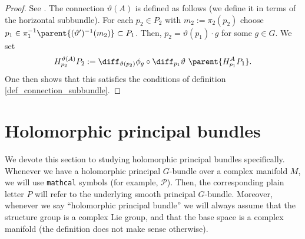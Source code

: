 \begin{proof}
    See \parencite[Chap. II, Prop. 6.1]{kobayashi_vol1}. The connection \(\vartheta(A)\) is defined as follows (we define it in terms of the horizontal subbundle). For each \(p_2 \in P_2\) with \(m_2:=\pi_2(p_2)\) choose \(p_1 \in \pi_1^{-1}\parent{(\vartheta')^{-1}(m_2)} \subset P_1\). Then, \(p_2=\vartheta(p_1) \cdot g\) for some \(g \in G\). We set
    \[
    H^{\vartheta(A)}_{p_2}P_2:=\diff_{\vartheta(p_2)} \phi_g \circ \diff_{p_1} \vartheta \ \parent{H^A_{p_1}P_1}.
    \]  
    One then shows that this satisfies the conditions of definition \ref{def_connection_subbundle}.
\end{proof}

\section{Holomorphic principal bundles} \label{sec_complex_principal_bundles}
We devote this section to studying holomorphic principal bundles specifically. Whenever we have a holomorphic principal \(G\)-bundle over a complex manifold \(M\), we will use \texttt{mathcal} symbols (for example, \(\mathcal{P}\)). Then, the corresponding plain letter \(P\) will refer to the underlying smooth principal \(G\)-bundle. Moreover, whenever we say ``holomorphic principal bundle'' we will always assume that the structure group is a complex Lie group, and that the base space is a complex manifold (the definition does not make sense otherwise). 

